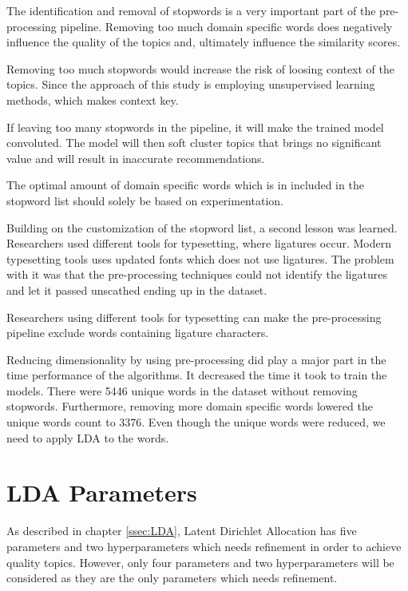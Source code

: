 \begin{lesson}
The identification and removal of stopwords is a very important part of the pre-processing pipeline. Removing too much domain specific words does negatively influence the quality of the topics and, ultimately influence the similarity scores.
\end{lesson}\label{L:goldilocks}

Removing too much stopwords would increase the risk of loosing context of the topics. Since the approach of this study is employing unsupervised learning methods, which makes context key.

If leaving too many stopwords in the pipeline, it will make the trained model convoluted. The model will then soft cluster topics that brings no significant value and will result in inaccurate recommendations.

The optimal amount of domain specific words which is in included in the stopword list should solely be based on experimentation.

Building on the customization of the stopword list, a second lesson was learned. Researchers used different tools for typesetting, where ligatures occur. Modern typesetting tools uses updated fonts which does not use ligatures. The problem with it was that the pre-processing techniques could not identify the ligatures and let it passed unscathed ending up in the dataset.

\begin{lesson}
Researchers using different tools for typesetting can make the pre-processing pipeline exclude words containing ligature characters.
\end{lesson}\label{L:ligature}

Reducing dimensionality by using pre-processing did play a major part in the time performance of the algorithms. It decreased the time it took to train the models. There were 5446 unique words in the dataset without removing stopwords. Furthermore, removing more domain specific words lowered the unique words count to 3376. Even though the unique words were reduced, we need to apply LDA to the words.

\section{LDA Parameters}
As described in chapter \ref{ssec:LDA}, Latent Dirichlet Allocation has five parameters and two hyperparameters which needs refinement in order to achieve quality topics. However, only four parameters and two hyperparameters will be considered as they are the only parameters which needs refinement.

